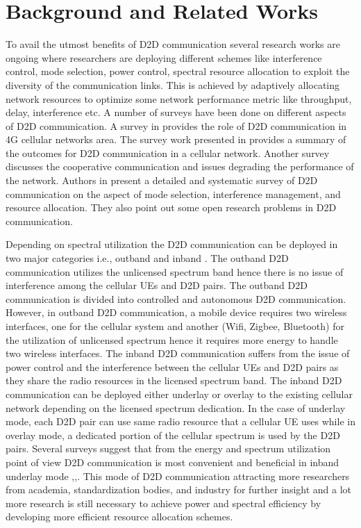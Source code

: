 \documentclass[times]{dacauth}
\begin{document}
\section{Background and Related Works}\label{section:Related Work}
\vspace {-0.3cm}
To avail the utmost benefits of D2D communication several research works are ongoing where researchers are deploying different schemes like interference control, mode selection, power control, spectral resource allocation to exploit the diversity of the communication links. This is achieved by adaptively allocating network resources to optimize some network performance metric like throughput, delay, interference etc. A number of surveys have been done on different aspects of D2D communication. A survey in \cite{asadi2014survey} provides the role of D2D communication in 4G cellular networks area. The survey work presented in \cite{liu2015device} provides a summary of the outcomes for D2D communication in a cellular network. Another survey \cite{alkurd2014survey} discusses the cooperative communication and issues degrading the performance of the network. Authors in \cite{ali2016} present a detailed and systematic survey of D2D communication on the aspect of mode selection, interference management, and resource allocation. They also point out some open research problems in D2D communication.

\noindent
Depending on spectral utilization the D2D communication can be deployed in two major categories i.e., outband and inband \cite{ali2016}. The outband D2D communication utilizes the unlicensed spectrum band hence there is no issue of interference among the cellular UEs and D2D pairs. The outband D2D communication is divided into controlled and autonomous D2D communication. However, in outband D2D communication, a mobile device requires two wireless interfaces, one for the cellular system and another (Wifi, Zigbee, Bluetooth) for the utilization of unlicensed spectrum hence it requires more energy to handle two wireless interfaces. The inband D2D communication suffers from the issue of power control and the interference between the cellular UEs and D2D pairs as they share the radio resources in the licensed spectrum band. The inband D2D communication can be deployed either underlay or overlay to the existing cellular network depending on the licensed spectrum dedication. In the case of underlay mode, each D2D pair can use same radio resource that a cellular UE uses while in overlay mode, a dedicated portion of the cellular spectrum is used by the D2D pairs. Several surveys suggest that from the energy and spectrum utilization point of view D2D communication is most convenient and beneficial in inband underlay mode \cite{ali2016},\cite{alkurd2014survey},\cite{asadi2014survey}. This mode of D2D communication attracting more researchers from academia, standardization bodies, and industry for further insight and a lot more research is still necessary to achieve power and spectral efficiency by developing more efficient resource allocation schemes. 
\end{document}
